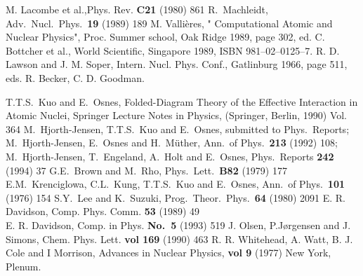 \begin{thebibliography}{9}
%
%
 M. Lacombe et al.,Phys. Rev. {\bf C21} (1980) 861
%
 R.\ Machleidt, Adv.\ Nucl.\ Phys.\ {\bf 19} (1989)  189
%
 M. Valli\`{e}res, " Computational Atomic and Nuclear
Physics", Proc. Summer school, Oak Ridge 1989, page 302,
ed. C. Bottcher et al., World Scientific, Singapore 1989,
ISBN 981--02--0125--7.
 R. D. Lawson and J. M. Soper, Intern. Nucl. Phys.
Conf., Gatlinburg 1966, page 511, eds. R. Becker, C. D. Goodman.
%


 T.T.S.\ Kuo and E.\ Osnes, Folded-Diagram Theory
of the Effective Interaction in Atomic Nuclei, Springer Lecture
Notes in Physics, (Springer, Berlin, 1990) Vol. 364
%
 M.\ Hjorth-Jensen, T.T.S.\ Kuo and
E.\ Osnes, submitted to Phys.\ Reports; M.\ Hjorth-Jensen,
E.\ Osnes and H.\ M\"{u}ther, Ann.\ of Phys.\  {\bf 213} (1992) 108;
M.\ Hjorth-Jensen, T.\ Engeland, A.\ Holt and E.\ Osnes, Phys.\ Reports
{\bf 242} (1994) 37
%
 G.E.\ Brown and M.\ Rho, Phys.\ Lett.\ {\bf B82} (1979) 177
%
  E.M.\ Krenciglowa, C.L.\ Kung, T.T.S.\ Kuo
and E.\ Osnes, Ann.\ of Phys.\   {\bf 101} (1976) 154
%
 S.Y.\ Lee and K.\ Suzuki, Prog.\ Theor.\ Phys.\
{\bf 64} (1980) 2091
%
 E. R. Davidson, Comp. Phys. Comm. {\bf 53} (1989) 49\\
                E. R. Davidson, Comp. in  Phys. {\bf No.~5} (1993) 519
%
 J. Olsen, P.J{\o}rgensen and J. Simons, Chem. Phys. Lett.
{\bf vol 169} (1990) 463
%
 R. R. Whitehead, A. Watt, B. J. Cole and I Morrison,
Advances in Nuclear Physics, {\bf vol 9} (1977) New York, Plenum.
%


\end{thebibliography}
